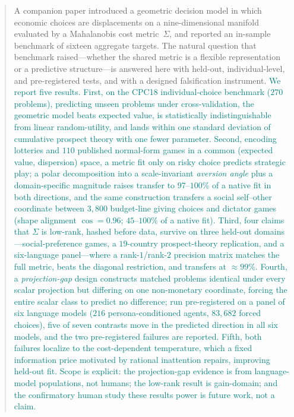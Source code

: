 \documentclass[journal]{IEEEtran}
\newcommand{\rev}[1]{\textcolor{teal}{#1}}
\begin{document}
\begin{abstract}
A companion paper introduced a geometric decision model in which economic choices are displacements on a nine-dimensional manifold evaluated by a Mahalanobis cost metric~$\Sigma$, and reported an in-sample benchmark of sixteen aggregate targets.
The natural question that benchmark raised---whether the shared metric is a flexible representation or a predictive structure---is answered here with held-out, individual-level, and pre-registered tests, and with a designed falsification instrument.
\rev{We report five results.
First, on the CPC18 individual-choice benchmark ($270$ problems), predicting unseen problems under cross-validation, the geometric model beats expected value, is statistically indistinguishable from linear random-utility, and lands within one standard deviation of cumulative prospect theory with one fewer parameter.
Second, encoding lotteries and $110$ published normal-form games in a common (expected value, dispersion) space, a metric fit only on risky choice predicts strategic play; a polar decomposition into a scale-invariant \emph{aversion angle} plus a domain-specific magnitude raises transfer to $97$--$100\%$ of a native fit in both directions, and the same construction transfers a social self--other coordinate between $3{,}800$ budget-line giving choices and dictator games (shape alignment $\cos=0.96$; $45$--$100\%$ of a native fit).
Third, four claims that $\Sigma$ is low-rank, hashed before data, survive on three held-out domains---social-preference games, a $19$-country prospect-theory replication, and a six-language panel---where a rank-$1$/rank-$2$ precision matrix matches the full metric, beats the diagonal restriction, and transfers at $\approx99\%$.
Fourth, a \emph{projection-gap} design constructs matched problems identical under every scalar projection but differing on one non-monetary coordinate, forcing the entire scalar class to predict no difference; run pre-registered on a panel of six language models ($216$ persona-conditioned agents, $83{,}682$ forced choices), five of seven contrasts move in the predicted direction in all six models, and the two pre-registered failures are reported.
Fifth, both failures localize to the cost-dependent temperature, which a fixed information price motivated by rational inattention repairs, improving held-out fit.
Scope is explicit: the projection-gap evidence is from language-model populations, not humans; the low-rank result is gain-domain; and the confirmatory human study these results power is future work, not a claim.}
\end{abstract}
\end{document}
